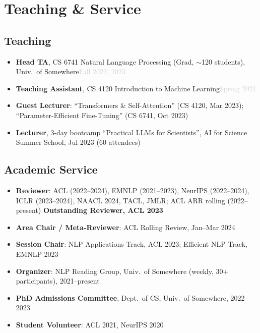 \documentclass[10pt, letterpaper]{article}
\begin{document}
\section{Teaching \& Service}

\subsection*{Teaching}
\begin{itemize}
  \item \textbf{Head TA}, CS 6741 Natural Language Processing (Grad, $\sim$120 students), Univ.\ of Somewhere\hfill\textcolor{lightgray}{\small Fall 2022, 2023}
  \item \textbf{Teaching Assistant}, CS 4120 Introduction to Machine Learning\hfill\textcolor{lightgray}{\small Spring 2021}
  \item \textbf{Guest Lecturer}: ``Transformers \& Self-Attention'' (CS 4120, Mar 2023); ``Parameter-Efficient Fine-Tuning'' (CS 6741, Oct 2023)
  \item \textbf{Lecturer}, 3-day bootcamp ``Practical LLMs for Scientists'', AI for Science Summer School, Jul 2023 (60 attendees)
\end{itemize}

\subsection*{Academic Service}
\begin{itemize}
  \item \textbf{Reviewer}: ACL (2022--2024), EMNLP (2021--2023), NeurIPS (2022--2024), ICLR (2023--2024), NAACL 2024, TACL, JMLR; ACL ARR rolling (2022--present) \quad \textcolor{accentblue}{\textbf{Outstanding Reviewer, ACL 2023}}
  \item \textbf{Area Chair / Meta-Reviewer}: ACL Rolling Review, Jan--Mar 2024
  \item \textbf{Session Chair}: NLP Applications Track, ACL 2023; Efficient NLP Track, EMNLP 2023
  \item \textbf{Organizer}: NLP Reading Group, Univ.\ of Somewhere (weekly, 30+ participants), 2021--present
  \item \textbf{PhD Admissions Committee}, Dept.\ of CS, Univ.\ of Somewhere, 2022--2023
  \item \textbf{Student Volunteer}: ACL 2021, NeurIPS 2020
\end{itemize}
\end{document}
